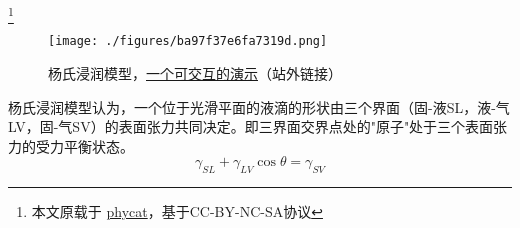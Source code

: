 
\begin{issues}
\issueDraft
\end{issues}

\footnote{本文原载于 \href{https://www.phycat.cn/archives/230/}{phycat}，基于CC-BY-NC-SA协议}

\begin{figure}[ht]
\centering
\texttt{[image: ./figures/ba97f37e6fa7319d.png]}
\caption{杨氏浸润模型，\href{https://www.phycat.cn/archives/230/}{一个可交互的演示}（站外链接）} \label{fig_YNGMDL_1}
\end{figure}
杨氏浸润模型认为，一个位于光滑平面的液滴的形状由三个界面（固-液SL，液-气LV，固-气SV）的表面张力共同决定。即三界面交界点处的"原子"处于三个表面张力的受力平衡状态。
\begin{equation}
\gamma_{SL}+\gamma_{LV}\cos\theta=\gamma_{SV}
\end{equation}
